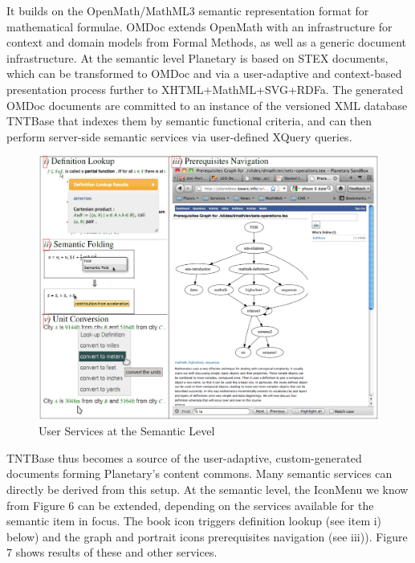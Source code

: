 It builds on the OpenMath/MathML3 semantic representation format for mathematical formulae. OMDoc extends OpenMath with an infrastructure for context and domain models from
Formal Methods, as well as a generic document infrastructure. At the semantic level
Planetary is based on STEX documents, which can be transformed to OMDoc and via a
user-adaptive and context-based presentation process further to XHTML+MathML+SVG+RDFa. The
generated OMDoc documents are committed to an instance of the versioned XML database
TNTBase that indexes them by semantic functional criteria, and can then perform
server-side semantic services via user-defined XQuery queries.

\begin{figure}[ht]\centering
  \includegraphics[width=\textwidth]{UserServices}
  \caption{User Services at the Semantic Level}\label{fig:adt:semantic} 
\end{figure} 

TNTBase thus becomes a source of the user-adaptive, custom-generated documents forming
Planetary's content commons. Many semantic services can directly be derived from this setup. At the semantic level, the IconMenu we know from Figure 6 can be extended,
depending on the services available for the semantic item in focus. The book icon triggers
definition lookup (see item i) below) and the graph and portrait icons prerequisites
navigation (see iii)). Figure 7 shows results of these and other services.

